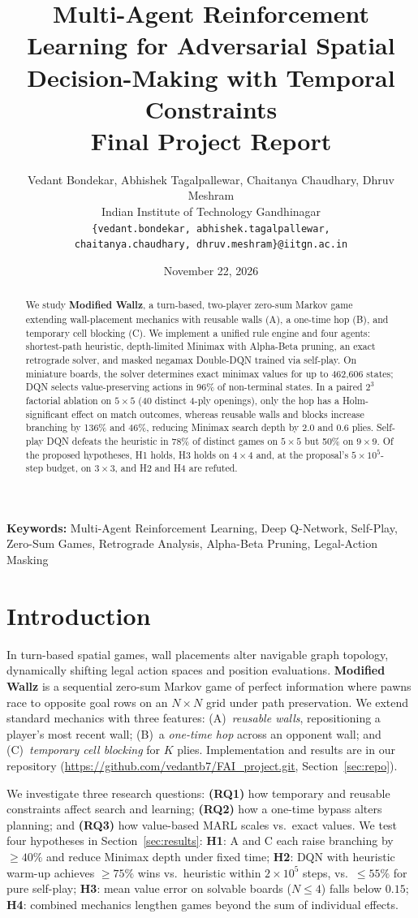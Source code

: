 \documentclass[10pt]{article}
\title{\vspace{-2.2em}Multi-Agent Reinforcement Learning for Adversarial Spatial\\ Decision-Making with Temporal Constraints\\[0.4ex]
\large Final Project Report}
\author{Vedant Bondekar, Abhishek Tagalpallewar, Chaitanya Chaudhary, Dhruv Meshram\\
Indian Institute of Technology Gandhinagar\\
\texttt{\{vedant.bondekar, abhishek.tagalpallewar,}\\
\texttt{chaitanya.chaudhary, dhruv.meshram\}@iitgn.ac.in}}
\date{November 22, 2026\vspace{-1.2em}}
\newcommand{\Wallz}{\textbf{Modified Wallz}}
\begin{document}
\maketitle
\thispagestyle{empty}

\begin{abstract}
We study \Wallz{}, a turn-based, two-player zero-sum Markov game extending wall-placement mechanics with reusable walls (A), a one-time hop (B), and temporary cell blocking (C). We implement a unified rule engine and four agents: shortest-path heuristic, depth-limited Minimax with Alpha-Beta pruning, an exact retrograde solver, and masked negamax Double-DQN trained via self-play. On miniature boards, the solver determines exact minimax values for up to 462{,}606 states; DQN selects value-preserving actions in 96\% of non-terminal states. In a paired $2^3$ factorial ablation on $5\times5$ (40 distinct 4-ply openings), only the hop has a Holm-significant effect on match outcomes, whereas reusable walls and blocks increase branching by 136\% and 46\%, reducing Minimax search depth by 2.0 and 0.6 plies. Self-play DQN defeats the heuristic in 78\% of distinct games on $5\times5$ but 50\% on $9\times9$. Of the proposed hypotheses, H1 holds, H3 holds on $4\times4$ and, at the proposal's $5\times10^5$-step budget, on $3\times3$, and H2 and H4 are refuted.
\end{abstract}

\noindent\textbf{Keywords:} Multi-Agent Reinforcement Learning, Deep Q-Network, Self-Play, Zero-Sum Games, Retrograde Analysis, Alpha-Beta Pruning, Legal-Action Masking

\section{Introduction}
In turn-based spatial games, wall placements alter navigable graph topology, dynamically shifting legal action spaces and position evaluations. \Wallz{} is a sequential zero-sum Markov game of perfect information where pawns race to opposite goal rows on an $N\times N$ grid under path preservation. We extend standard mechanics with three features: (A)~\emph{reusable walls}, repositioning a player's most recent wall; (B)~a \emph{one-time hop} across an opponent wall; and (C)~\emph{temporary cell blocking} for $K$ plies. Implementation and results are in our repository (\url{https://github.com/vedantb7/FAI_project.git}, Section~\ref{sec:repo}).

We investigate three research questions: \textbf{(RQ1)} how temporary and reusable constraints affect search and learning; \textbf{(RQ2)} how a one-time bypass alters planning; and \textbf{(RQ3)} how value-based MARL scales vs.\ exact values. We test four hypotheses in Section~\ref{sec:results}:
\textbf{H1}: A and C each raise branching by $\geq 40\%$ and reduce Minimax depth under fixed time;
\textbf{H2}: DQN with heuristic warm-up achieves $\geq 75\%$ wins vs.\ heuristic within $2\times10^5$ steps, vs.\ $\leq 55\%$ for pure self-play;
\textbf{H3}: mean value error on solvable boards ($N\leq 4$) falls below $0.15$;
\textbf{H4}: combined mechanics lengthen games beyond the sum of individual effects.
\end{document}
